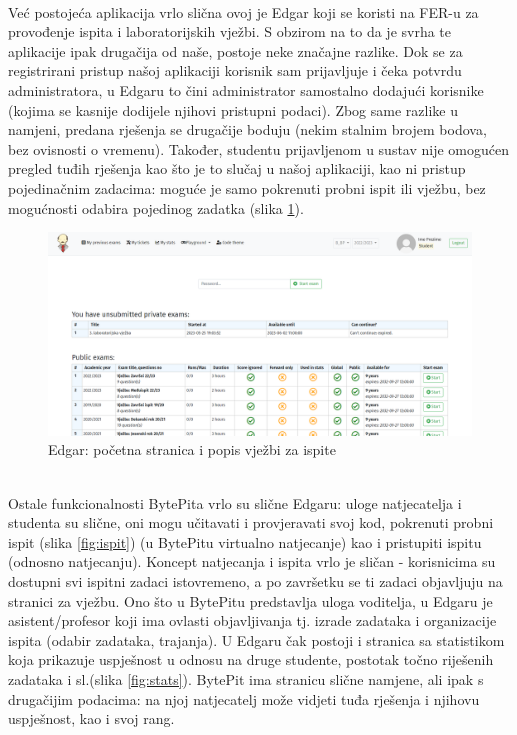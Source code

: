 		\\
		Već postojeća aplikacija vrlo slična ovoj je Edgar koji se koristi na FER-u za provođenje ispita i laboratorijskih vježbi.	S obzirom na to da je svrha te aplikacije ipak drugačija od naše, postoje neke značajne razlike. Dok se za registrirani pristup našoj aplikaciji korisnik sam prijavljuje i čeka potvrdu administratora, u Edgaru to čini administrator samostalno dodajući korisnike (kojima se kasnije dodijele njihovi pristupni podaci). Zbog same razlike u namjeni, predana rješenja se drugačije boduju (nekim stalnim brojem bodova, bez ovisnosti o vremenu). Također, studentu prijavljenom u sustav nije omogućen pregled tuđih rješenja kao što je to slučaj u našoj aplikaciji, kao ni pristup pojedinačnim zadacima: moguće je samo pokrenuti probni ispit ili vježbu, bez mogućnosti odabira pojedinog zadatka (slika  \ref{fig:pocstr}).\\
			\begin{figure}[H]
			\includegraphics[scale=0.4]{slike/edgar1}
			\centering
			\caption{Edgar: početna stranica i popis vježbi za ispite}
			\label{fig:pocstr}
		\end{figure}
				\noindent\\
		Ostale funkcionalnosti BytePita vrlo su slične Edgaru: uloge natjecatelja i studenta su slične, oni mogu učitavati i provjeravati svoj kod, pokrenuti probni ispit (slika \ref{fig:ispit}) (u BytePitu virtualno natjecanje) kao i pristupiti ispitu (odnosno natjecanju). Koncept natjecanja i ispita vrlo je sličan - korisnicima su dostupni svi ispitni zadaci istovremeno, a po završetku se ti zadaci objavljuju na stranici za vježbu. 
		Ono što u BytePitu predstavlja uloga voditelja, u Edgaru je asistent/profesor koji ima ovlasti objavljivanja tj. izrade zadataka i organizacije ispita (odabir zadataka, trajanja). U Edgaru čak postoji i stranica sa statistikom koja prikazuje uspješnost u odnosu na druge studente, postotak točno riješenih zadataka i sl.(slika  \ref{fig:stats}). BytePit ima stranicu slične namjene, ali ipak s drugačijim podacima: na njoj natjecatelj može vidjeti tuđa rješenja i njihovu uspješnost, kao i svoj rang.	\\
		
